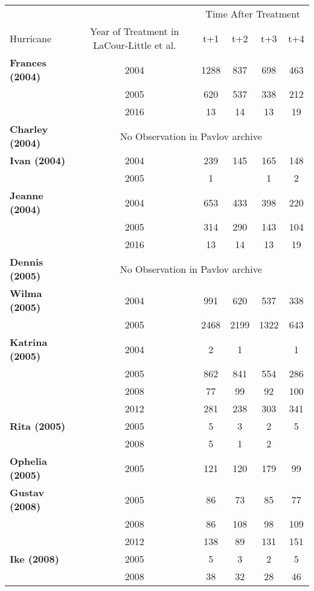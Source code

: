 {\footnotesize \begin{tabular}{lccccc}   
    \toprule
    & & \multicolumn{4}{c}{Time After Treatment} \\
    \cmidrule(lr){3-6} 
    Hurricane & Year of Treatment in LaCour-Little et al. & t+1 & t+2 & t+3 & t+4 \\   
    \midrule 
    \textbf{Frances (2004)} & 2004 & 1288 & 837 & 698 & 463 \\
     & 2005 & 620 & 537 & 338 & 212 \\
     & 2016 & 13 & 14 & 13 & 19 \\   
    \midrule 
    \textbf{Charley (2004)} & \multicolumn{5}{c}{No Observation in Pavlov archive} \\   
    \midrule 
    \textbf{Ivan (2004)} & 2004 & 239 & 145 & 165 & 148 \\
     & 2005 & 1 &  & 1 & 2 \\   
    \midrule 
    \textbf{Jeanne (2004)} & 2004 & 653 & 433 & 398 & 220 \\
     & 2005 & 314 & 290 & 143 & 104 \\
     & 2016 & 13 & 14 & 13 & 19 \\   
    \midrule 
    \textbf{Dennis (2005)} & \multicolumn{5}{c}{No Observation in Pavlov archive} \\   
    \midrule 
    \textbf{Wilma (2005)} & 2004 & 991 & 620 & 537 & 338 \\
     & 2005 & 2468 & 2199 & 1322 & 643 \\   
    \midrule 
    \textbf{Katrina (2005)} & 2004 & 2 & 1 &  & 1 \\
     & 2005 & 862 & 841 & 554 & 286 \\ 
     & 2008 & 77 & 99 & 92 & 100 \\
     & 2012 & 281 & 238 & 303 & 341 \\   
    \midrule 
    \textbf{Rita (2005)} & 2005 & 5 & 3 & 2 & 5 \\
     & 2008 & 5 & 1 & 2 &  \\   
    \midrule 
    \textbf{Ophelia (2005)} & 2005 & 121 & 120 & 179 & 99 \\   
    \midrule 
    \textbf{Gustav (2008)} & 2005 & 86 & 73 & 85 & 77 \\
     & 2008 & 86 & 108 & 98 & 109 \\
     & 2012 & 138 & 89 & 131 & 151 \\   
    \midrule 
    \textbf{Ike (2008)} & 2005 & 5 & 3 & 2 & 5 \\
     & 2008 & 38 & 32 & 28 & 46 \\   

\end{tabular}}
